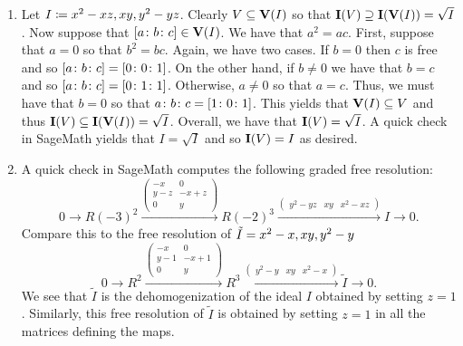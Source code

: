 \documentclass[letterpaper, 11pt, oneside]{book}
\begin{document}
\clearpage

\begin{sol}\label{ex:UAG_6.4.3}
  \begin{enumerate}
    \item Let $I \defeq \ideal{x^{2} - xz, xy, y^{2} - yz}$.
          Clearly $V \subseteq \operatorname{\mathbf{V}}(I)$ so that $\operatorname{\mathbf{I}}(V) \supseteq \operatorname{\mathbf{I}}(\operatorname{\mathbf{V}}(I)) = \sqrt{I}$.
          Now suppose that $\bqty{a \colon b \colon c} \in \V(I)$.
          We have that $a^{2} = ac$.
          First, suppose that $a = 0$ so that $b^{2} = bc$.
          Again, we have two cases.
          If $b = 0$ then $c$ is free and so $\bqty{a \colon b \colon c} = \bqty{0 \colon 0 \colon 1}$.
          On the other hand, if $b \neq 0$ we have that $b = c$ and so $\bqty{a \colon b \colon c} = \bqty{0 \colon 1 \colon 1}$.
          Otherwise, $a \neq 0$ so that $a = c$.
          Thus, we must have that $b = 0$ so that $\ideal{a \colon b \colon c} = \bqty{1 \colon 0 \colon 1}$.
          This yields that $\operatorname{\mathbf{V}}(I) \subseteq V$ and thus $\operatorname{\mathbf{I}}(V) \subseteq \operatorname{\mathbf{I}}(\operatorname{\mathbf{V}}(I)) = \sqrt{I}$.
          Overall, we have that $\operatorname{\mathbf{I}}(V) = \sqrt{I}$.
          A quick check in SageMath yields that $I = \sqrt{I}$ and so $\operatorname{\mathbf{I}}(V) = I$ as desired.
    \item A quick check in SageMath computes the following graded free resolution:
          \[
            0 \to R(-3)^{2} \xrightarrow{\begin{pmatrix} -x & 0 \\ y - z & -x + z \\ 0 & y \end{pmatrix}} R(-2)^{3} \xrightarrow{\begin{pmatrix} y^{2} - yz & xy & x^{2} - xz \end{pmatrix}} I \to 0.
          \]
          Compare this to the free resolution of $\tilde{I} = \ideal{x^{2} - x, xy, y^{2} - y}$
          \[
            0 \to R^{2} \xrightarrow{\begin{pmatrix} -x & 0 \\ y - 1 & -x + 1 \\ 0 & y \end{pmatrix}} R^{3} \xrightarrow{\begin{pmatrix} y^{2} - y & xy & x^{2} - x \end{pmatrix}} \tilde{I} \to 0.
          \]
          We see that $\tilde{I}$ is the dehomogenization of the ideal $I$ obtained by setting $z = 1$.
          Similarly, this free resolution of $\tilde{I}$ is obtained by setting $z = 1$ in all the matrices defining the maps.

\end{enumerate}
\end{sol}
\end{document}

